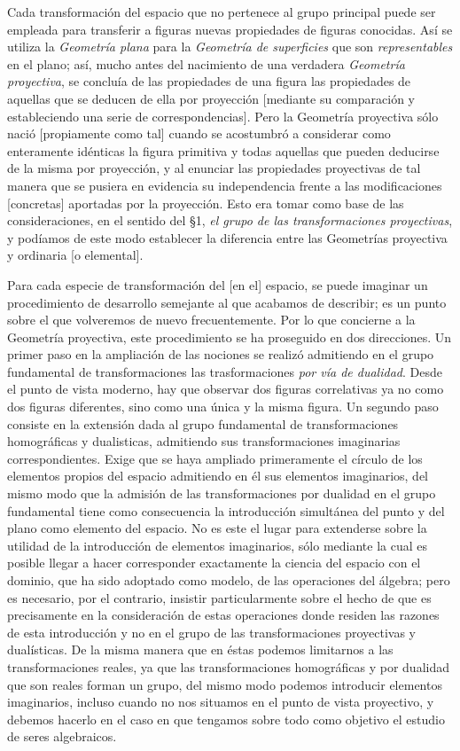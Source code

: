 \documentclass[a4paper, 12pt]{article}
\begin{document}
Cada transformación del espacio que no pertenece al grupo principal puede ser empleada para transferir a figuras nuevas propiedades de figuras conocidas. Así se utiliza la \textit{Geometría plana} para la \textit{Geometría de superficies} que son \textit{representables} en el plano; así, mucho antes del nacimiento de una verdadera \textit{Geometría proyectiva}, se concluía de las propiedades de una figura las propiedades de aquellas que se deducen de ella por proyección [mediante su comparación y estableciendo una serie de correspondencias]. Pero la Geometría proyectiva sólo nació [propiamente como tal] cuando se acostumbró a considerar como enteramente idénticas la figura primitiva y todas aquellas que pueden deducirse de la misma por proyección, y al enunciar las propiedades proyectivas de tal manera que se pusiera en evidencia su independencia frente a las modificaciones [concretas] aportadas por la proyección. Esto era tomar como base de las consideraciones, en el sentido del {\S}1, \textit{el grupo de las transformaciones proyectivas}, y podíamos de este modo establecer la diferencia entre las Geometrías proyectiva y ordinaria [o elemental].

Para cada especie de transformación del [en el] espacio, se puede imaginar un procedimiento de desarrollo semejante al que acabamos de describir; es un punto sobre el que volveremos de nuevo frecuentemente. Por lo que concierne a la Geometría proyectiva, este procedimiento se ha proseguido en dos direcciones. Un primer paso en la ampliación de las nociones se realizó admitiendo en el grupo fundamental de transformaciones las trasformaciones \textit{por vía de dualidad}. Desde el punto de vista moderno, hay que observar dos figuras correlativas ya no como dos figuras diferentes, sino como una única y la misma figura. Un segundo paso consiste en la extensión dada al grupo fundamental de transformaciones homográficas y dualisticas, admitiendo sus transformaciones imaginarias correspondientes. Exige que se haya ampliado primeramente el círculo de los elementos propios del espacio admitiendo en él sus elementos imaginarios, del mismo modo que la admisión de las transformaciones por dualidad en el grupo fundamental tiene como consecuencia la introducción simultánea del punto y del plano como elemento del espacio. No es este el lugar para extenderse sobre la utilidad de la introducción de elementos imaginarios, sólo mediante la cual es posible llegar a hacer corresponder exactamente la ciencia del espacio con el dominio, que ha sido adoptado como modelo, de las operaciones del álgebra; pero es necesario, por el contrario, insistir particularmente sobre el hecho de que es precisamente en la consideración de estas operaciones donde residen las razones de esta introducción y no en el grupo de las transformaciones proyectivas y dualísticas. De la misma manera que en éstas podemos limitarnos a las transformaciones reales, ya que las transformaciones homográficas y por dualidad que son reales forman un grupo, del mismo modo podemos introducir elementos imaginarios, incluso cuando no nos situamos en el punto de vista proyectivo, y debemos hacerlo en el caso en que tengamos sobre todo como objetivo el estudio de seres algebraicos.
\end{document}
